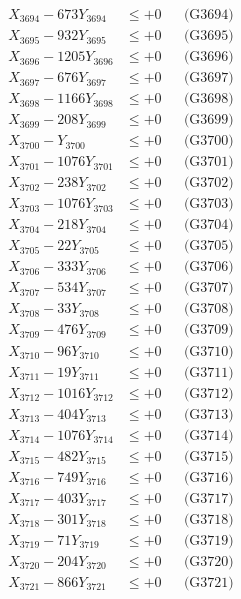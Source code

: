 \documentclass[a4paper,10pt]{article}
\begin{document}
{\begin{align}
X_{3694} - 673Y_{3694} &\leq +0 && \text{(G3694)} \\
X_{3695} - 932Y_{3695} &\leq +0 && \text{(G3695)} \\
X_{3696} - 1205Y_{3696} &\leq +0 && \text{(G3696)} \\
X_{3697} - 676Y_{3697} &\leq +0 && \text{(G3697)} \\
X_{3698} - 1166Y_{3698} &\leq +0 && \text{(G3698)} \\
X_{3699} - 208Y_{3699} &\leq +0 && \text{(G3699)} \\
X_{3700} - Y_{3700} &\leq +0 && \text{(G3700)} \\
\allowbreak
X_{3701} - 1076Y_{3701} &\leq +0 && \text{(G3701)} \\
X_{3702} - 238Y_{3702} &\leq +0 && \text{(G3702)} \\
X_{3703} - 1076Y_{3703} &\leq +0 && \text{(G3703)} \\
X_{3704} - 218Y_{3704} &\leq +0 && \text{(G3704)} \\
X_{3705} - 22Y_{3705} &\leq +0 && \text{(G3705)} \\
X_{3706} - 333Y_{3706} &\leq +0 && \text{(G3706)} \\
X_{3707} - 534Y_{3707} &\leq +0 && \text{(G3707)} \\
X_{3708} - 33Y_{3708} &\leq +0 && \text{(G3708)} \\
X_{3709} - 476Y_{3709} &\leq +0 && \text{(G3709)} \\
X_{3710} - 96Y_{3710} &\leq +0 && \text{(G3710)} \\
\allowbreak
X_{3711} - 19Y_{3711} &\leq +0 && \text{(G3711)} \\
X_{3712} - 1016Y_{3712} &\leq +0 && \text{(G3712)} \\
X_{3713} - 404Y_{3713} &\leq +0 && \text{(G3713)} \\
X_{3714} - 1076Y_{3714} &\leq +0 && \text{(G3714)} \\
X_{3715} - 482Y_{3715} &\leq +0 && \text{(G3715)} \\
X_{3716} - 749Y_{3716} &\leq +0 && \text{(G3716)} \\
X_{3717} - 403Y_{3717} &\leq +0 && \text{(G3717)} \\
X_{3718} - 301Y_{3718} &\leq +0 && \text{(G3718)} \\
X_{3719} - 71Y_{3719} &\leq +0 && \text{(G3719)} \\
X_{3720} - 204Y_{3720} &\leq +0 && \text{(G3720)} \\
\allowbreak
X_{3721} - 866Y_{3721} &\leq +0 && \text{(G3721)} \\

\end{align}}
\end{document}
